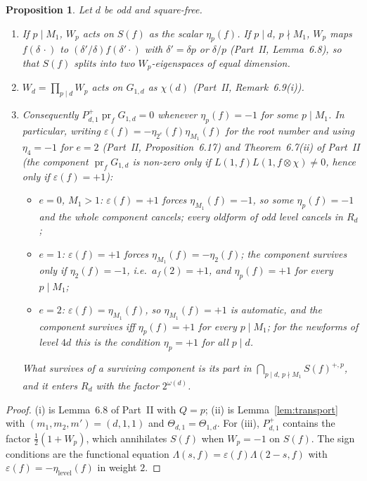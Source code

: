 \documentclass[11pt]{amsart}
\newtheorem{proposition}[theorem]{Proposition}
\theoremstyle{remark}
\newcommand{\e}{\varepsilon}
\DeclareMathOperator{\pr}{pr}
\begin{document}
\begin{proposition}\label{prop:cancel}
Let $d$ be odd and square-free.
\begin{enumerate}[label=\textup{(\roman*)},leftmargin=2.2em]
\item If $p\mid M_1$, $W_p$ acts on $S(f)$ as the scalar $\eta_p(f)$. If $p\mid d$, $p\nmid M_1$, $W_p$ maps $f(\delta\,\cdot)$ to $(\delta'/\delta)f(\delta'\cdot)$ with $\delta'=\delta p$ or $\delta/p$ (Part~II, Lemma~6.8), so that $S(f)$ splits into two $W_p$-eigenspaces of equal dimension.
\item $W_d=\prod_{p\mid d}W_p$ acts on $G_{1,d}$ as $\chi(d)$ (Part~II, Remark~6.9(i)).
\item Consequently $P^+_{d,1}\pr_fG_{1,d}=0$ whenever $\eta_p(f)=-1$ for some $p\mid M_1$. In particular, writing $\e(f)=-\eta_{2^e}(f)\eta_{M_1}(f)$ for the root number and using $\eta_4=-1$ for $e=2$ (Part~II, Proposition~6.17) and Theorem~6.7(ii) of Part~II (the component $\pr_fG_{1,d}$ is non-zero only if $L(1,f)L(1,f\otimes\chi)\ne0$, hence only if $\e(f)=+1$):
\begin{itemize}[leftmargin=1.6em]
\item $e=0$, $M_1>1$: $\e(f)=+1$ forces $\eta_{M_1}(f)=-1$, so some $\eta_p(f)=-1$ and the whole component cancels; \emph{every oldform of odd level cancels in $R_d$};
\item $e=1$: $\e(f)=+1$ forces $\eta_{M_1}(f)=-\eta_2(f)$; the component survives only if $\eta_2(f)=-1$, i.e.\ $a_f(2)=+1$, and $\eta_p(f)=+1$ for every $p\mid M_1$;
\item $e=2$: $\e(f)=\eta_{M_1}(f)$, so $\eta_{M_1}(f)=+1$ is automatic, and the component survives iff $\eta_p(f)=+1$ for every $p\mid M_1$; for the newforms of level $4d$ this is the condition $\eta_p=+1$ for all $p\mid d$.
\end{itemize}
What survives of a surviving component is its part in $\bigcap_{p\mid d,\,p\nmid M_1}S(f)^{+,p}$, and it enters $R_d$ with the factor $2^{\omega(d)}$.
\end{enumerate}
\end{proposition}
\begin{proof}
(i) is Lemma~6.8 of Part~II with $Q=p$; (ii) is Lemma~\ref{lem:transport} with $(m_1,m_2,m')=(d,1,1)$ and $\Theta_{d,1}=\Theta_{1,d}$. For (iii), $P^+_{d,1}$ contains the factor $\frac12(1+W_p)$, which annihilates $S(f)$ when $W_p=-1$ on $S(f)$. The sign conditions are the functional equation $\Lambda(s,f)=\e(f)\Lambda(2-s,f)$ with $\e(f)=-\eta_{\mathrm{level}}(f)$ in weight $2$.
\end{proof}
\end{document}
